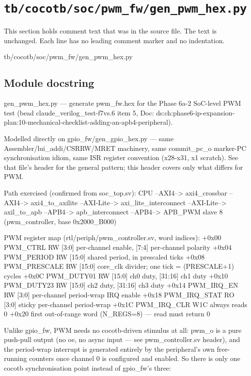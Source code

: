 \section{\texttt{tb/cocotb/soc/pwm\_fw/gen\_pwm\_hex.py}}\label{tm:suite:soc-pwm-fw-gen-pwm-hex}

This section holds comment text that was in the source file. The text is unchanged. Each line has no leading comment marker and no indentation.

\begin{relocated}{tb/cocotb/soc/pwm_fw/gen_pwm_hex.py}

\subsection*{Module docstring}

\begin{textblock}
gen_pwm_hex.py — generate pwm_fw.hex for the Phase 6a-2 SoC-level PWM test
(bead claude_verilog_test-f7vs.6 item 5, Doc: ds:ch:phase6-ip-expansion-plan:10-mechanical-checklist-adding-an-apb4-peripheral).

Modelled directly on gpio_fw/gen_gpio_hex.py — same Assembler/lui_addi/CSRRW/MRET
machinery, same commit_pc_o marker-PC synchronisation idiom, same ISR register
convention (x28-x31, x1 scratch). See that file's header for the general pattern;
this header covers only what differs for PWM.

Path exercised (confirmed from soc_top.sv):
CPU --AXI4--> axi4_crossbar --AXI4--> axi4_to_axilite --AXI-Lite-->
axi_lite_interconnect --AXI-Lite--> axil_to_apb --APB4--> apb_interconnect
--APB4--> APB_PWM slave 8 (pwm_controller, base 0x2000_B000)

PWM register map (rtl/periph/pwm_controller.sv, word indices):
+0x00 PWM_CTRL      RW  [3:0] per-channel enable, [7:4] per-channel polarity
+0x04 PWM_PERIOD    RW  [15:0] shared period, in prescaled ticks
+0x08 PWM_PRESCALE  RW  [15:0] core_clk divider; one tick = (PRESCALE+1) cycles
+0x0C PWM_DUTY01    RW  [15:0] ch0 duty, [31:16] ch1 duty
+0x10 PWM_DUTY23    RW  [15:0] ch2 duty, [31:16] ch3 duty
+0x14 PWM_IRQ_EN    RW  [3:0] per-channel period-wrap IRQ enable
+0x18 PWM_IRQ_STAT  RO  [3:0] sticky per-channel period-wrap
+0x1C PWM_IRQ_CLR   W1C always reads 0
+0x20 first out-of-range word (N_REGS=8) — read must return 0

Unlike gpio_fw, PWM needs no cocotb-driven stimulus at all: pwm_o is a pure
push-pull output (no oe, no async input — see pwm_controller.sv header), and
the period-wrap interrupt is generated entirely by the peripheral's own free-
running counters once channel 0 is configured and enabled. So there is only
one cocotb synchronisation point instead of gpio_fw's three:


\end{textblock}
\end{relocated}
